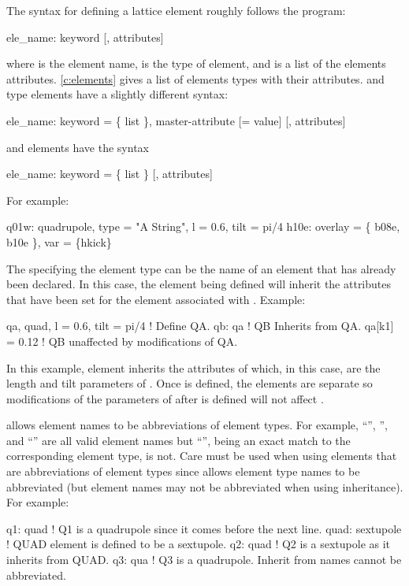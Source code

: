 The syntax for defining a lattice element roughly follows the
\mad\cite{b:maduser} program:
\begin{example}
  ele_name: keyword [, attributes]
\end{example}
where  is the element name,  is the type of element, and  is
a list of the elements attributes. \cref{c:elements} gives a list of elements types with their
attributes.   and  type elements have a slightly different syntax:
\begin{example}
  ele_name: keyword = \{ list \}, master-attribute [= value] [, attributes]
\end{example}
and  elements have the syntax
\begin{example}
  ele_name: keyword = \{ list \} [, attributes]
\end{example}  
For example:
\begin{example}
  q01w: quadrupole, type = "A String", l = 0.6, tilt = pi/4
  h10e: overlay = \{ b08e, b10e \}, var = \{hkick\}
\end{example}

The  specifying the element type can be the name of an element that has already been
declared. In this case, the element being defined will inherit the attributes that have been
set for the element associated with . Example:
\begin{example}
  qa, quad, l = 0.6, tilt = pi/4  ! Define QA.
  qb: qa                          ! QB Inherits from QA.
  qa[k1] = 0.12                   ! QB unaffected by modifications of QA.
\end{example}
In this example, element  inherits the attributes of  which, in this case, are the
length and tilt parameters of . Once  is defined, the elements are separate so 
modifications of the parameters of  after  is defined will not affect .

\bmad allows element names to be abbreviations of element types. For example, ``'', '',
and ``'' are all valid element names but ``'', being an exact match to
the corresponding element type, is not. Care must be used when using elements that are abbreviations
of element types since \bmad allows element type names to be abbreviated (but element names may not
be abbreviated when using inheritance). For example:
\begin{example}
  q1: quad          ! Q1 is a quadrupole since it comes before the next line.
  quad: sextupole   ! QUAD element is defined to be a sextupole.
  q2: quad          ! Q2 is a sextupole as it inherits from QUAD.
  q3: qua           ! Q3 is a quadrupole. Inherit from names cannot be abbreviated.
\end{example}

